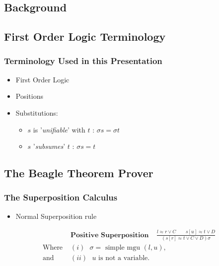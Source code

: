 \documentclass[10pt,xcolor={dvipsnames}]{beamer}
\begin{document}
\begin{NoHyper}
\section{Background}

\subsection{First Order Logic Terminology}

\begin{frame}
  \frametitle{Terminology Used in this Presentation}
  \begin{itemize}
  \item<1-> First Order Logic
  \item<2-> Positions
  \item<3-> Substitutions:
    \begin{itemize}
    \item<3-> $s$ is '\emph{unifiable}' with $t$ : $\sigma s = \sigma t$
    \item<3-> $s$ '\emph{subsumes}' $t$ : $\sigma s = t$
    \end{itemize}
  \end{itemize}
\end{frame}

\subsection{The Beagle Theorem Prover}

\begin{frame}
  \frametitle{The Superposition Calculus}
  \begin{itemize}
  \item<1-> Normal Superposition rule
  \end{itemize}
  \begin{align*}
&\textbf{Positive Superposition}\ \ \ \ \  \frac{l \approx r \lor C\quad \quad s[u] \approx t \lor D}{(s[r] \approx t \lor C \lor D)\sigma}\\
\text{Where } &(i) \text{ $\sigma = $ simple mgu $(l,u)$,}\\
\text{and } &(ii) \text{ $u$ is not a variable.}
\end{align*}
\end{frame}


\end{NoHyper}
\end{document}
